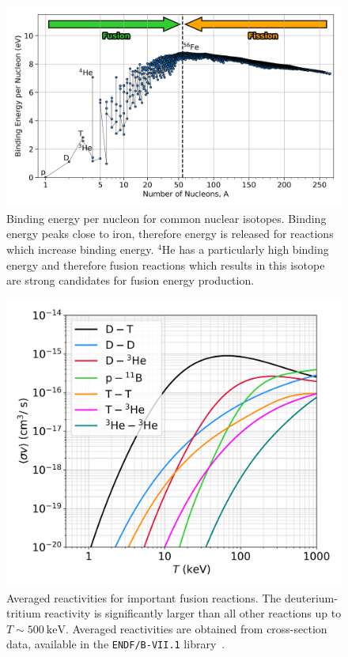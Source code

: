 \begin{figure}[t!]
    \includegraphics[width=0.9\linewidth]{Introduction/Images/BE_per_nucleon.png}
    \centering
    \caption{Binding energy per nucleon for common nuclear isotopes.
    Binding energy peaks close to iron, therefore energy is released for reactions which increase binding energy.
    ${}^{4}\text{He}$ has a particularly high binding energy and therefore fusion reactions which results in this isotope are strong candidates for fusion energy production.}%
    \label{fig:intro_BEperNucleon}
\end{figure}

\begin{figure}[t!]
    \includegraphics[width=0.6\linewidth]{Introduction/Images/fusion-reactivities.png}
    \centering
    \caption{Averaged reactivities for important fusion reactions.
    The deuterium-tritium reactivity is significantly larger than all other reactions up to $T\sim500\ \text{keV}$.
    Averaged reactivities are obtained from cross-section data, available in the \texttt{ENDF/B-VII.1} library~\cite{chadwick_endf_2011}.
    }%
    \label{fig:intro_reactivities}
\end{figure}

